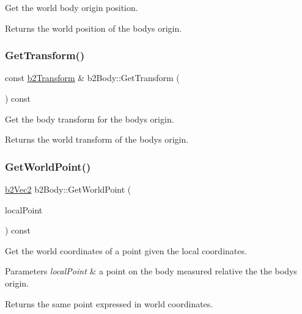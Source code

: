 Get the world body origin position. \begin{DoxyReturn}{Returns}
the world position of the body\textquotesingle{}s origin. 
\end{DoxyReturn}
\mbox{\label{classb2_body_afb316448e6e555ceb2df23ed216b2f53}} 
\subsubsection{\texorpdfstring{Get\+Transform()}{GetTransform()}}
{\footnotesize\ttfamily const \hyperlink{structb2_transform}{b2\+Transform} \& b2\+Body\+::\+Get\+Transform (\begin{DoxyParamCaption}{ }\end{DoxyParamCaption}) const\hspace{0.3cm}{\ttfamily [inline]}}

Get the body transform for the body\textquotesingle{}s origin. \begin{DoxyReturn}{Returns}
the world transform of the body\textquotesingle{}s origin. 
\end{DoxyReturn}
\mbox{\label{classb2_body_a712b782c61963c6f07beca86acc631ae}} 
\subsubsection{\texorpdfstring{Get\+World\+Point()}{GetWorldPoint()}}
{\footnotesize\ttfamily \hyperlink{structb2_vec2}{b2\+Vec2} b2\+Body\+::\+Get\+World\+Point (\begin{DoxyParamCaption}\item[{const \hyperlink{structb2_vec2}{b2\+Vec2} \&}]{local\+Point }\end{DoxyParamCaption}) const\hspace{0.3cm}{\ttfamily [inline]}}

Get the world coordinates of a point given the local coordinates. 
\begin{DoxyParams}{Parameters}
{\em local\+Point} & a point on the body measured relative the the body\textquotesingle{}s origin. \\
\hline
\end{DoxyParams}
\begin{DoxyReturn}{Returns}
the same point expressed in world coordinates. 
\end{DoxyReturn}
\mbox{\label{classb2_body_ae8c434785b2a730f7c385e708b345bb6}} 
